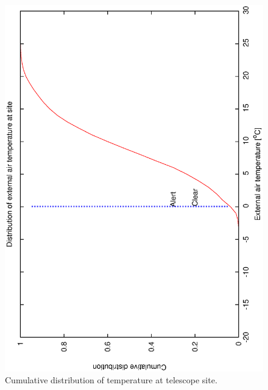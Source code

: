 \begin{figure}[htbp]
\begin{center}
    \includegraphics[scale=0.4, angle=-90]{figures/ecs/temp_1525_cum.dat.eps}
\caption[Cumulative distribution of temperature at telescope site.]
{Cumulative distribution of temperature at telescope site.}
\end{center}
    \label{fig:met_temp_cum_dist}
\end{figure}


